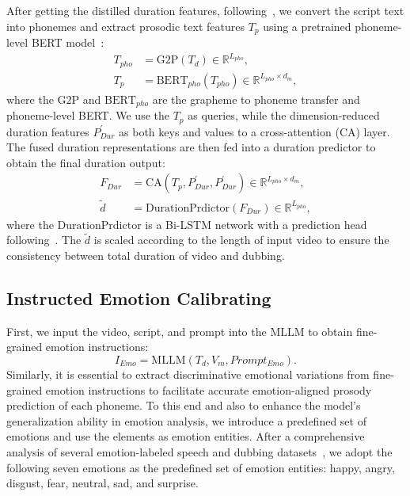 After getting the distilled duration features, following~\cite{ProDubber}, we convert the script text into phonemes and extract prosodic text features $T_p$ using a pretrained phoneme-level BERT model~\cite{pl=bert}:
\begin{equation}
\begin{split}
    T_{pho} &= \mathrm{G2P}(T_d)\in \mathbb{R}^{L_{pho}},
    \\ T_p &= \mathrm{BERT}_{pho}(T_{pho})\in \mathbb{R}^{L_{pho}\times d_{m}},
    \end{split}
\end{equation}
where the $\mathrm{G2P}$ and $\mathrm{BERT}_{pho}$ are the grapheme to phoneme transfer and phoneme-level BERT. 
We use the $T_p$  as queries, while the dimension-reduced duration features $P^{\prime}_{Dur}$ as both keys and values to a cross-attention (CA) layer. 
The fused duration representations are then fed into a duration predictor to obtain the final duration output:
\begin{equation}
\begin{split}
    F_{Dur}&=\mathrm{CA}(T_p, P_{Dur}^{\prime}, P_{Dur}^{\prime})\in\mathbb{R}^{L_{pho}\times d_{m}},
    \\ \tilde{d} &= \mathrm{DurationPrdictor}(F_{Dur})\in\mathbb{R}^{L_{pho}},
    \end{split}
\end{equation}
where the $\mathrm{DurationPrdictor}$ is a Bi-LSTM network with a prediction head following~\cite{StyleTTS2}.
The $ \tilde{d}$ is scaled according to the length of input video to ensure the consistency between total duration of video and dubbing.

\subsection{Instructed Emotion Calibrating}
First, we input the video, script, and prompt into the MLLM to obtain fine-grained emotion instructions:
\begin{equation}
     I_{Emo} = \mathrm{MLLM}(T_d,V_{m},Prompt_{Emo}).
\end{equation}
Similarly, it is essential to extract discriminative emotional variations from fine-grained emotion instructions to facilitate accurate emotion-aligned prosody prediction of each phoneme.
To this end and also to enhance the model's generalization ability in emotion analysis, we introduce a predefined set of emotions and use the elements as emotion entities.
After a comprehensive analysis of several emotion-labeled speech and dubbing datasets~\cite{V2C, esd}, we adopt the following seven emotions as the predefined set of emotion entities: happy, angry, disgust, fear, neutral, sad, and surprise.

